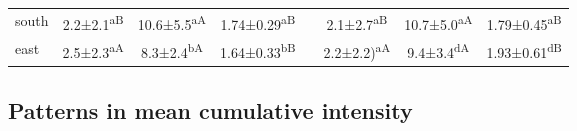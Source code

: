 \documentclass[a4paper,10pt,review]{elsarticle}
\begin{document}
\begin{table}[]
\begin{tiny}
\begin{tabular}{lccccccc}
south & 2.2±2.1\textsuperscript{aB} & 10.6±5.5\textsuperscript{aA} & 1.74±0.29\textsuperscript{aB} && 2.1±2.7\textsuperscript{aB} & 10.7±5.0\textsuperscript{aA} & 1.79±0.45\textsuperscript{aB} \\
east & 2.5±2.3\textsuperscript{aA} & 8.3±2.4\textsuperscript{bA} & 1.64±0.33\textsuperscript{bB} && 2.2±2.2)\textsuperscript{aA} & 9.4±3.4\textsuperscript{dA} & 1.93±0.61\textsuperscript{dB} \\
\bottomrule
\end{tabular}
\end{tiny}
\end{table}

\subsection{Patterns in mean cumulative intensity}
\end{document}
